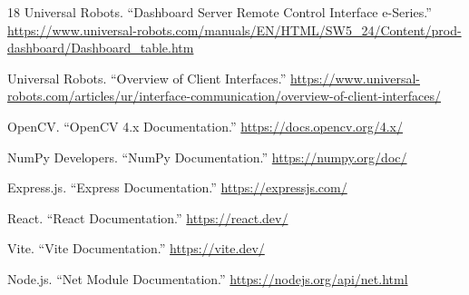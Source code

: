 \documentclass[12pt]{article}
\begin{document}
\begin{thebibliography}{18}
Universal Robots.
``Dashboard Server Remote Control Interface e-Series.''
\url{https://www.universal-robots.com/manuals/EN/HTML/SW5_24/Content/prod-dashboard/Dashboard_table.htm}

Universal Robots.
``Overview of Client Interfaces.''
\url{https://www.universal-robots.com/articles/ur/interface-communication/overview-of-client-interfaces/}

OpenCV.
``OpenCV 4.x Documentation.''
\url{https://docs.opencv.org/4.x/}

NumPy Developers.
``NumPy Documentation.''
\url{https://numpy.org/doc/}

Express.js.
``Express Documentation.''
\url{https://expressjs.com/}

React.
``React Documentation.''
\url{https://react.dev/}

Vite.
``Vite Documentation.''
\url{https://vite.dev/}

Node.js.
``Net Module Documentation.''
\url{https://nodejs.org/api/net.html}

\end{thebibliography}
\end{document}

